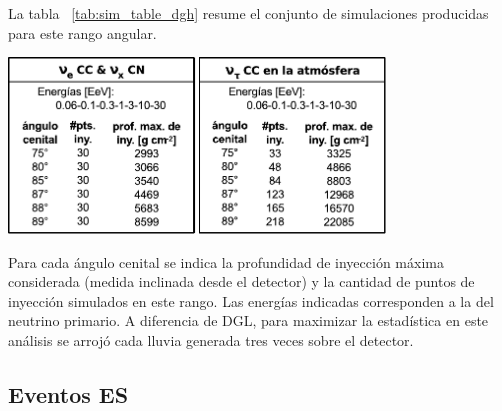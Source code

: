 		La tabla ~\ref{tab:sim_table_dgh} resume el conjunto de simulaciones producidas para este rango angular.
		\begin{table}[ht]
		\begin{center}
		\includegraphics[width=0.75\textwidth]{fig/simulacionAuger/sim_table.pdf}
		\end{center}
		\caption{
		Resumen, discriminado por canal de interacción, de las simulaciones de neutrinos profundos realizadas para el canal DGH.
		Para cada ángulo cenital se indica la profundidad de inyección máxima considerada (medida inclinada desde el detector) y la cantidad de puntos de inyección simulados en este rango. Las energías indicadas corresponden a la del neutrino primario.
		}
		\label{tab:sim_table_dgh}
		\end{table}
		Para cada ángulo cenital se indica la profundidad de inyección máxima considerada (medida inclinada desde el detector) y la cantidad de puntos de inyección simulados en este rango. Las energías indicadas corresponden a la del neutrino primario.
		A diferencia de DGL, para maximizar la estadística en este an\'alisis se arroj\'o cada lluvia generada tres veces sobre el detector.
		
		\subsection{Eventos ES}
		
